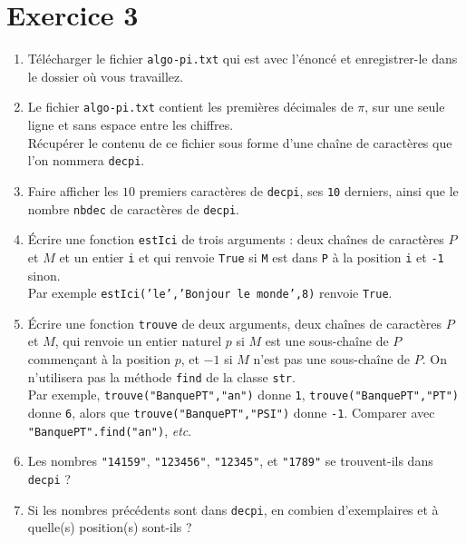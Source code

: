 \section*{Exercice 3}
\begin{enumerate}
\item Télécharger le fichier \texttt{algo-pi.txt} qui est avec l'énoncé et enregistrer-le dans le dossier où vous travaillez.
\item Le fichier \texttt{algo-pi.txt} contient les premières décimales de $\pi$, sur une seule ligne et sans espace entre les chiffres.\\
Récupérer le contenu de ce fichier sous forme d'une chaîne de caractères que l'on nommera \texttt{decpi}.
\item Faire afficher les $10$ premiers caractères de \texttt{decpi}, ses \texttt{10} derniers, ainsi que le nombre \texttt{nbdec} de caractères de \texttt{decpi}.
\item Écrire une fonction \verb?estIci? de trois arguments : deux chaînes de caractères $P$ et $M$ et un entier \verb?i? et qui renvoie \verb?True? si \verb?M? est dans \verb?P? \` a la position \verb?i? et \verb?-1? sinon.\\ 
Par exemple \texttt{estIci('le','Bonjour le monde',8)} renvoie \texttt{True}.
\item Écrire une fonction \texttt{trouve} de deux arguments, deux chaînes de caractères $P$ et $M$, qui renvoie un entier naturel $p$ si $M$ est une sous-chaîne de $P$ commençant à la position $p$, et $-1$ si $M$ n'est pas
une sous-chaîne de $P$. On n'utilisera pas la méthode \texttt{find} de la classe \texttt{str}.\\
Par exemple, \texttt{trouve("BanquePT","an")} donne \texttt{1}, \texttt{trouve("BanquePT","PT")} donne \texttt{6}, alors que \texttt{trouve("BanquePT","PSI")} donne \texttt{-1}. Comparer avec \texttt{"BanquePT".find("an")}, \textit{etc}.
\item Les nombres \texttt{"14159"}, \texttt{"123456"}, \texttt{"12345"}, et \texttt{"1789"} se trouvent-ils dans \texttt{decpi} ?
\item Si les nombres précédents sont dans \texttt{decpi}, en combien d'exemplaires et à quelle(s) position(s) sont-ils ?
\end{enumerate}







